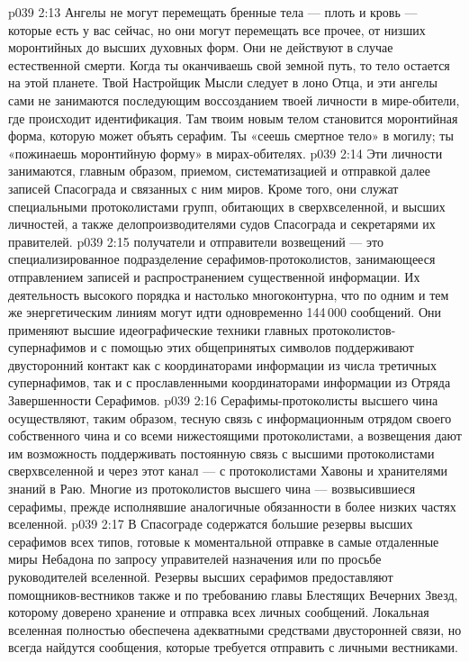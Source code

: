 \vs p039 2:13 \pc Ангелы не могут перемещать бренные тела --- плоть и кровь --- которые есть у вас сейчас, но они могут перемещать все прочее, от низших моронтийных до высших духовных форм. Они не действуют в случае естественной смерти. Когда ты оканчиваешь свой земной путь, то тело остается на этой планете. Твой Настройщик Мысли следует в лоно Отца, и эти ангелы сами не занимаются последующим воссозданием твоей личности в мире\hyp{}обители, где происходит идентификация. Там твоим новым телом становится моронтийная форма, которую может объять серафим. Ты «сеешь смертное тело» в могилу; ты «пожинаешь моронтийную форму» в мирах\hyp{}обителях.
\vs p039 2:14 \pc {}\bibnobreakspace {} Эти личности занимаются, главным образом, приемом, систематизацией и отправкой далее записей Спасограда и связанных с ним миров. Кроме того, они служат специальными протоколистами групп, обитающих в сверхвселенной, и высших личностей, а также делопроизводителями судов Спасограда и секретарями их правителей.
\vs p039 2:15 \pc {} получатели и отправители возвещений --- это специализированное подразделение серафимов\hyp{}протоколистов, занимающееся отправлением записей и распространением существенной информации. Их деятельность высокого порядка и настолько многоконтурна, что по одним и тем же энергетическим линиям могут идти одновременно 144\,000 сообщений. Они применяют высшие идеографические техники главных протоколистов\hyp{}супернафимов и с помощью этих общепринятых символов поддерживают двусторонний контакт как с координаторами информации из числа третичных супернафимов, так и с прославленными координаторами информации из Отряда Завершенности Серафимов.
\vs p039 2:16 Серафимы\hyp{}протоколисты высшего чина осуществляют, таким образом, тесную связь с информационным отрядом своего собственного чина и со всеми нижестоящими протоколистами, а возвещения дают им возможность поддерживать постоянную связь с высшими протоколистами сверхвселенной и через этот канал --- с протоколистами Хавоны и хранителями знаний в Раю. Многие из протоколистов высшего чина --- возвысившиеся серафимы, прежде исполнявшие аналогичные обязанности в более низких частях вселенной.
\vs p039 2:17 \pc {}\bibnobreakspace {} В Спасограде содержатся большие резервы высших серафимов всех типов, готовые к моментальной отправке в самые отдаленные миры Небадона по запросу управителей назначения или по просьбе руководителей вселенной. Резервы высших серафимов предоставляют помощников\hyp{}вестников также и по требованию главы Блестящих Вечерних Звезд, которому доверено хранение и отправка всех личных сообщений. Локальная вселенная полностью обеспечена адекватными средствами двусторонней связи, но всегда найдутся сообщения, которые требуется отправить с личными вестниками.
